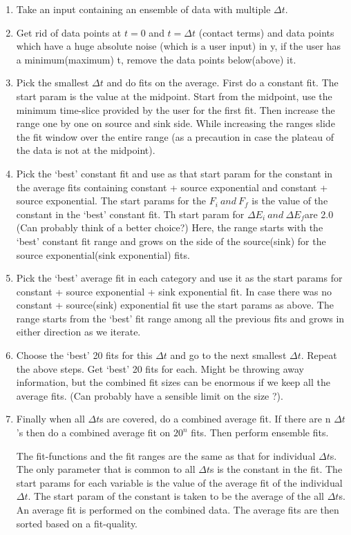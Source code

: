 \documentclass[10pt]{article}
\begin{document}
\begin{enumerate}
  \item Take an input containing an ensemble of data with multiple $\Delta t$.
  \item Get rid of data points at $t = 0$ and $t = \Delta t$ (contact terms) and data points which have a huge absolute noise (which is a user input) in y, if the user has a minimum(maximum) t, remove the data points below(above) it.
  \item Pick the smallest $\Delta t$ and do fits on the average. First do a constant fit. The start param is the value at the midpoint. Start from the midpoint, use the minimum time-slice provided by the user for the first fit. Then increase the range one by one on source and sink side. While increasing the ranges slide the fit window over the entire range (as a precaution in case the plateau of the data is not at the midpoint).
  \item Pick the `best' constant fit and use as that start param for the constant in the average fits containing  constant + source exponential and  constant + source exponential. The start params for the $F_i\ and\ F_f$ is the value of the constant in the `best' constant fit. Th start param for $\Delta E_i\ and\ \Delta E_f $are 2.0 (Can probably think of a better choice?) Here, the range starts with the `best' constant fit range and grows on the side of the source(sink) for the source exponential(sink exponential) fits. 
  \item Pick the `best' average fit in each category and use it as the start params for constant + source exponential + sink exponential fit. In case there was no constant + source(sink) exponential fit use the start params as above. The range starts from the `best' fit range among all the previous fits and grows in either direction as we iterate.
  \item Choose the `best' 20 fits for this $\Delta t$ and go to the next smallest $\Delta t$. Repeat the above steps. Get `best' 20 fits for each. Might be throwing away information, but the combined fit sizes can be enormous if we keep all the average fits. (Can probably have a sensible limit on the size ?).
  \item Finally when all $\Delta t$s are covered, do a combined average fit. If there are n $\Delta t$'s then do a combined average fit on $20^n$ fits. Then perform ensemble fits. \par
  The  fit-functions and the fit ranges are the same as that for individual $\Delta t$s. The only parameter that is common to all $\Delta t$s is the constant in the fit. The start params for each variable is the value of the average fit of the individual $\Delta t$. The start param of the constant is taken to be the average of the all $\Delta t$s. An average fit is performed on the combined data. The average fits are then sorted based on a fit-quality.

\end{enumerate}
\end{document}
